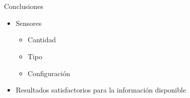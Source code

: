 \documentclass[spanish]{beamer}
\begin{document}
\section[Conclusiones]{}

\begin{frame}{Conclusiones}
  \begin{itemize}
  \item Sensores
    \begin{itemize}
    \item Cantidad
    \item Tipo
    \item Configuración
    \end{itemize}
  \item Resultados satisfactorios para la información disponible
  \end{itemize}
\end{frame}
\end{document}
